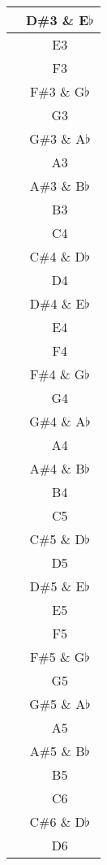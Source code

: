 \documentclass[twoside]{article}
\newcounter{rownumber}
\begin{document}
\begin{center}
\begin{supertabular}{>{\therownumber} c c}
     \hline
     & D\#3 \& E$\flat$  \\ 
     \hline
     & E3 \\ 
     \hline
     & F3 \\ 
     \hline
     & F\#3 \& G$\flat$ \\ 
     \hline
     & G3 \\ 
     \hline
     & G\#3 \& A$\flat$ \\ 
     \hline
     & A3 \\ 
     \hline
     & A\#3 \& B$\flat$ \\ 
     \hline
     & B3 \\ 
     \hline
     & C4 \\ 
     \hline
     & C\#4 \& D$\flat$  \\ 
     \hline
     & D4  \\ 
     \hline
     & D\#4 \& E$\flat$  \\ 
     \hline
     & E4 \\ 
     \hline
     & F4 \\ 
     \hline
     & F\#4 \& G$\flat$ \\ 
     \hline
     & G4 \\ 
     \hline
     & G\#4 \& A$\flat$ \\ 
     \hline
     & A4 \\ 
     \hline
     & A\#4 \& B$\flat$ \\ 
     \hline
     & B4 \\
     \hline
     & C5 \\ 
     \hline
     & C\#5 \& D$\flat$   \\ 
     \hline
     & D5  \\ 
     \hline
     & D\#5 \& E$\flat$   \\ 
     \hline
     & E5 \\ 
     \hline
     & F5 \\ 
     \hline
     & F\#5 \& G$\flat$  \\ 
     \hline
     & G5 \\ 
     \hline
     & G\#5 \& A$\flat$  \\ 
     \hline
     & A5 \\ 
     \hline
     & A\#5 \& B$\flat$  \\ 
     \hline
     & B5 \\
     \hline
     & C6 \\ 
     \hline
     & C\#6 \& D$\flat$  \\ 
     \hline
     & D6  \\ 
     \hline

\end{supertabular}
\end{center}
\end{document}
